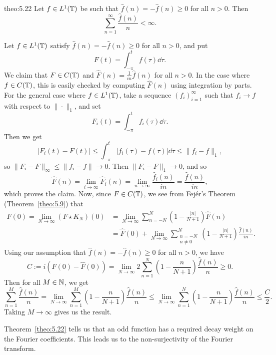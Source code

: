 \begin{theo}{theo:5.22}
    Let $f \in L^1(\mathbb{T})$ be such that $\hat f(n) = -\hat f(n) \geq 0$ for all 
    $n > 0$. Then 
    \[ \sum_{n=1}^\infty \frac{\hat f(n)}{n} < \infty. \] 
\end{theo}
\begin{pf}
    Let $f \in L^1(\mathbb{T})$ satisfy $\hat f(n) = -\hat f(n) \geq 0$ for all 
    $n > 0$, and put 
    \[ F(t) = \int_{-\pi}^t f(\tau)\dd\tau. \] 
    We claim that $F \in C(\mathbb{T})$ and $\hat F(n) = \frac{1}{in} \hat f(n)$
    for all $n > 0$. 
    In the case where $f \in C(\mathbb{T})$, this is easily checked by 
    computing $\hat F(n)$ using integration by parts. For the 
    general case where $f \in L^1(\mathbb{T})$, take a sequence $(f_i)_{i=1}^\infty$
    such that $f_i \to f$ with respect to $\|\cdot\|_1$, and set 
    \[ F_i(t) = \int_{-\pi}^t f_i(\tau)\dd\tau. \] 
    Then we get 
    \[ |F_i(t) - F(t)| \leq \int_{-\pi}^t |f_i(\tau) - f(\tau)|\dd\tau 
    \leq \|f_i - f\|_1, \] 
    so $\|F_i - F\|_\infty \leq \|f_i - f\| \to 0$. Then 
    $\|F_i - F\|_1 \to 0$, and so 
    \[ \hat F(n) = \lim_{i\to\infty} \hat F_i(n) = \lim_{n\to\infty} 
    \frac{\hat f_i(n)}{in} = \frac{\hat f(n)}{in}, \] 
    which proves the claim. Now, since $F \in C(\mathbb{T})$, we see from 
    Fej\'er's Theorem (Theorem~\ref{theo:5.9}) that 
    \begin{align*}
        F(0) = \lim_{N\to\infty} (F \star K_N)(0) 
        &= \lim_{N\to\infty} \sum_{n=-N}^N \left( 1 - \frac{|n|}{N+1} \right) \hat F(n) \\ 
        &= \hat F(0) + \lim_{N\to\infty} \sum_{\substack{n=-N \\ n\neq0}}^N 
        \left( 1 - \frac{|n|}{N+1} \right) \frac{\hat f(n)}{in}.
    \end{align*}
    Using our assumption that $\hat f(n) = -\hat f(n) \geq 0$ for all $n > 0$, 
    we have 
    \[ C := i(F(0) - \hat F(0)) = \lim_{N\to\infty} 2 
    \sum_{n=1}^N \left( 1 - \frac{n}{N+1} \right) \frac{\hat f(n)}{n} 
    \geq 0. \] 
    Then for all $M \in \mathbb{N}$, we get 
    \[ \sum_{n=1}^M \frac{\hat f(n)}{n} 
    = \lim_{N\to\infty} \sum_{n=1}^M \left(1 - \frac{n}{N+1} \right)
    \frac{\hat f(n)}{n} \leq \lim_{N\to\infty} \sum_{n=1}^N
    \left(1 - \frac{n}{N+1} \right) \frac{\hat f(n)}{n} \leq \frac{C}{2}. \] 
    Taking $M \to \infty$ gives us the result. 
\end{pf}

Theorem~\ref{theo:5.22} tells us that an odd function has a required decay 
weight on the Fourier coefficients. This leads us to the non-surjectivity 
of the Fourier transform.

